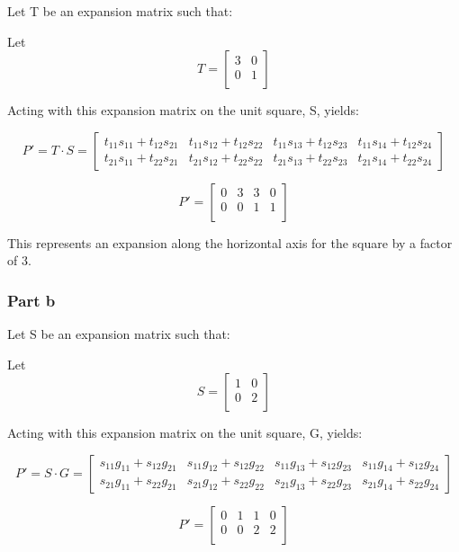 \documentclass{article}
\begin{document}
Let T be an expansion matrix such that:

Let \[T = 
\begin{bmatrix}
    3 & 0  \\
    0 & 1  \\
\end{bmatrix}
\]

Acting with this expansion matrix on the unit square, S, yields:

\[ 
P' = T \cdot S = 
\begin{bmatrix}
    t_{11}s_{11} + t_{12}s_{21} & t_{11}s_{12} + t_{12}s_{22} & t_{11}s_{13} + t_{12}s_{23} & t_{11}s_{14} + t_{12}s_{24} \\
    t_{21}s_{11} + t_{22}s_{21} & t_{21}s_{12} + t_{22}s_{22} & t_{21}s_{13} + t_{22}s_{23} & t_{21}s_{14} + t_{22}s_{24}
\end{bmatrix}
\]

\[P' = 
\begin{bmatrix}
    0 & 3 & 3 & 0 \\
    0 & 0 & 1 & 1 \\
\end{bmatrix}
\]

This represents an expansion along the horizontal axis for the square by a factor of 3.

\subsubsection*{Part b}

Let S be an expansion matrix such that:

Let \[S = 
\begin{bmatrix}
    1 & 0  \\
    0 & 2  \\
\end{bmatrix}
\]

Acting with this expansion matrix on the unit square, G, yields:

\[ 
P' = S \cdot G = 
\begin{bmatrix}
    s_{11}g_{11} + s_{12}g_{21} & s_{11}g_{12} + s_{12}g_{22} & s_{11}g_{13} + s_{12}g_{23} & s_{11}g_{14} + s_{12}g_{24} \\
    s_{21}g_{11} + s_{22}g_{21} & s_{21}g_{12} + s_{22}g_{22} & s_{21}g_{13} + s_{22}g_{23} & s_{21}g_{14} + s_{22}g_{24}
\end{bmatrix}
\]

\[P' = 
\begin{bmatrix}
    0 & 1 & 1 & 0 \\
    0 & 0 & 2 & 2 \\
\end{bmatrix}
\]
\end{document}
